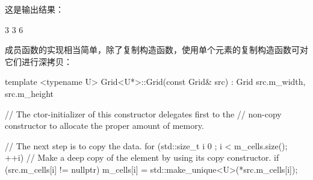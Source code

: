 这是输出结果：

\begin{shell}
3
3
6
\end{shell}

成员函数的实现相当简单，除了复制构造函数，使用单个元素的复制构造函数可对它们进行深拷贝：

\begin{cpp}
template <typename U>
Grid<U*>::Grid(const Grid& src)
    : Grid { src.m_width, src.m_height }
{
    // The ctor-initializer of this constructor delegates first to the
    // non-copy constructor to allocate the proper amount of memory.

    // The next step is to copy the data.
    for (std::size_t i { 0 }; i < m_cells.size(); ++i) {
        // Make a deep copy of the element by using its copy constructor.
        if (src.m_cells[i] != nullptr) {
            m_cells[i] = std::make_unique<U>(*src.m_cells[i]);
        }
    }
}
\end{cpp}






































